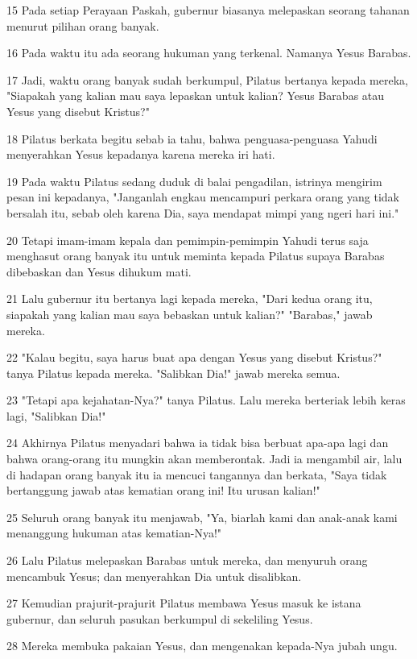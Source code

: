 \par 15 Pada setiap Perayaan Paskah, gubernur biasanya melepaskan seorang tahanan menurut pilihan orang banyak.
\par 16 Pada waktu itu ada seorang hukuman yang terkenal. Namanya Yesus Barabas.
\par 17 Jadi, waktu orang banyak sudah berkumpul, Pilatus bertanya kepada mereka, "Siapakah yang kalian mau saya lepaskan untuk kalian? Yesus Barabas atau Yesus yang disebut Kristus?"
\par 18 Pilatus berkata begitu sebab ia tahu, bahwa penguasa-penguasa Yahudi menyerahkan Yesus kepadanya karena mereka iri hati.
\par 19 Pada waktu Pilatus sedang duduk di balai pengadilan, istrinya mengirim pesan ini kepadanya, "Janganlah engkau mencampuri perkara orang yang tidak bersalah itu, sebab oleh karena Dia, saya mendapat mimpi yang ngeri hari ini."
\par 20 Tetapi imam-imam kepala dan pemimpin-pemimpin Yahudi terus saja menghasut orang banyak itu untuk meminta kepada Pilatus supaya Barabas dibebaskan dan Yesus dihukum mati.
\par 21 Lalu gubernur itu bertanya lagi kepada mereka, "Dari kedua orang itu, siapakah yang kalian mau saya bebaskan untuk kalian?" "Barabas," jawab mereka.
\par 22 "Kalau begitu, saya harus buat apa dengan Yesus yang disebut Kristus?" tanya Pilatus kepada mereka. "Salibkan Dia!" jawab mereka semua.
\par 23 "Tetapi apa kejahatan-Nya?" tanya Pilatus. Lalu mereka berteriak lebih keras lagi, "Salibkan Dia!"
\par 24 Akhirnya Pilatus menyadari bahwa ia tidak bisa berbuat apa-apa lagi dan bahwa orang-orang itu mungkin akan memberontak. Jadi ia mengambil air, lalu di hadapan orang banyak itu ia mencuci tangannya dan berkata, "Saya tidak bertanggung jawab atas kematian orang ini! Itu urusan kalian!"
\par 25 Seluruh orang banyak itu menjawab, "Ya, biarlah kami dan anak-anak kami menanggung hukuman atas kematian-Nya!"
\par 26 Lalu Pilatus melepaskan Barabas untuk mereka, dan menyuruh orang mencambuk Yesus; dan menyerahkan Dia untuk disalibkan.
\par 27 Kemudian prajurit-prajurit Pilatus membawa Yesus masuk ke istana gubernur, dan seluruh pasukan berkumpul di sekeliling Yesus.
\par 28 Mereka membuka pakaian Yesus, dan mengenakan kepada-Nya jubah ungu.
